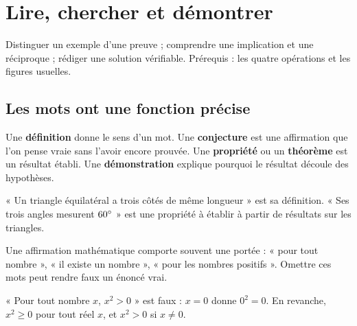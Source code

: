 \documentclass[../cours_3e.tex]{subfiles}
\begin{document}
\setcounter{chapter}{0}
\chapter{Lire, chercher et démontrer}
\label{ch:raisonner}
\begin{objectif}
Distinguer un exemple d'une preuve ; comprendre une implication et une réciproque ; rédiger une solution vérifiable. Prérequis : les quatre opérations et les figures usuelles.
\end{objectif}
\section{Les mots ont une fonction précise}
\begin{definition}
Une \textbf{définition} donne le sens d'un mot. Une \textbf{conjecture} est une affirmation que l'on pense vraie sans l'avoir encore prouvée. Une \textbf{propriété} ou un \textbf{théorème} est un résultat établi. Une \textbf{démonstration} explique pourquoi le résultat découle des hypothèses.
\end{definition}
« Un triangle équilatéral a trois côtés de même longueur » est sa définition. « Ses trois angles mesurent $60^{\circ}$ » est une propriété à établir à partir de résultats sur les triangles.

Une affirmation mathématique comporte souvent une portée : « pour tout nombre », « il existe un nombre », « pour les nombres positifs ». Omettre ces mots peut rendre faux un énoncé vrai.
\begin{exemple}
« Pour tout nombre $x$, $x^2>0$ » est faux : $x=0$ donne $0^2=0$. En revanche, $x^2\geq0$ pour tout réel $x$, et $x^2>0$ si $x\ne0$.
\end{exemple}
\end{document}
